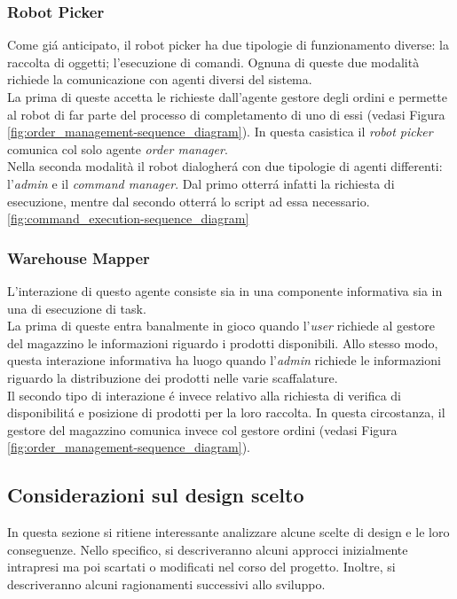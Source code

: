 \subsubsection{Robot Picker}
Come gi\'a anticipato, il robot picker ha due tipologie di funzionamento diverse: la raccolta di oggetti; l'esecuzione di comandi. Ognuna di queste due modalità richiede la comunicazione con agenti diversi del sistema.\\
La prima di queste accetta le richieste dall'agente gestore degli ordini e permette al robot di far parte del processo di completamento di uno di essi (vedasi Figura \ref{fig:order_management-sequence_diagram}). In questa casistica il \textit{robot picker} comunica col solo agente \textit{order manager}.\\
Nella seconda modalità il robot dialogher\'a con due tipologie di agenti differenti: l'\textit{admin} e il \textit{command manager}. Dal primo otterr\'a infatti la richiesta di esecuzione, mentre dal secondo otterr\'a lo script ad essa necessario.
\ref{fig:command_execution-sequence_diagram}

\subsubsection{Warehouse Mapper}
L'interazione di questo agente consiste sia in una componente informativa sia in una di esecuzione di task.\\ La prima di queste entra banalmente in gioco quando l'\textit{user} richiede al gestore del magazzino le informazioni riguardo i prodotti disponibili. Allo stesso modo, questa interazione informativa ha luogo quando l'\textit{admin} richiede le informazioni riguardo la distribuzione dei prodotti nelle varie scaffalature.\\
Il secondo tipo di interazione \'e invece relativo alla richiesta di verifica di disponibilit\'a e posizione di prodotti per la loro raccolta. In questa circostanza, il gestore del magazzino comunica invece col gestore ordini (vedasi Figura \ref{fig:order_management-sequence_diagram}).

\subsection{Considerazioni sul design scelto}
In questa sezione si ritiene interessante analizzare alcune scelte di design e le loro conseguenze. Nello specifico, si descriveranno alcuni approcci inizialmente intrapresi ma poi scartati o modificati nel corso del progetto. Inoltre, si descriveranno alcuni ragionamenti successivi allo sviluppo.


